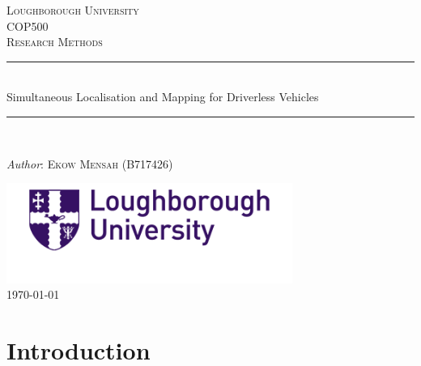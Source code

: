 \documentclass[a4paper, 12pt]{article}
\begin{document}
\begin{titlepage}

 \newcommand{\HRule}{\rule{\linewidth}{0.5mm}}
 
 \center %
 
 \textsc{\LARGE Loughborough University}\\[1.5cm]
 
 \textsc{\Large COP500}\\[0.5cm]
 
 \textsc{\large Research Methods}\\[0.5cm]
 
\HRule\\[0.4cm]

 {\huge Simultaneous Localisation and Mapping for Driverless Vehicles}\\[0.4cm]

\HRule\\[1.5cm]

\begin{minipage}{0.4\textwidth}
 \begin{center}
   \large
   \textit{Author}: \textsc{Ekow Mensah (B717426)}
 \end{center}
 \end{minipage}

\vfill\vfill

\includegraphics[width=0.7\textwidth]{logo.png}\\[1cm]

\vfill\vfill\vfill
{\large\today}

 
\end{titlepage}
 
\newpage

\tableofcontents{}

\newpage

\section{Introduction}

\onehalfspacing
\end{document}
